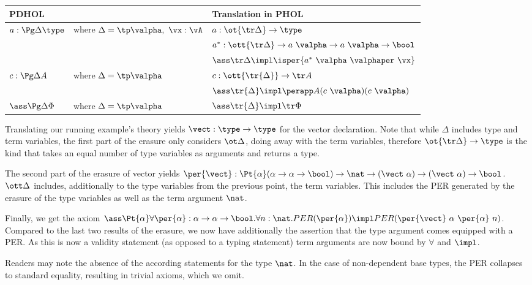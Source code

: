 \begin{center}
\begin{tabular}{|ll|l|}
\hline
PDHOL && Translation in PHOL\\
\hline
$a:\Pg\Delta\type$ &where $\Delta=\tp\valpha,\ \vx:\vA$ & $a:\ot{\tr\Delta}\to\type$ \\
     && $a^*:\ott{\tr\Delta}\to a\ \valpha \to a\ \valpha\to\bool$ \\
     && $\ass \tr\Delta \impl\isper{a^*\ \valpha\ \valphaper\ \vx}$ \\
\hline
$c:\Pg\Delta A$ &where $\Delta=\tp\valpha$            & $c:\ott{\tr{\Delta}}\to\tr A$ \\&& $\ass \tr{\Delta}\impl \perapp A {(c\ \valpha)} {(c\ \valpha)}$\\
\hline
$\ass \Pg\Delta  \Phi$ &where $\Delta=\tp\valpha$        & $\ass \tr{\Delta} \impl \tr \Phi$ \\
\hline
\end{tabular}
\end{center}

\begin{example}
  \label{ex:trans2}
  Translating our running example's theory yields \(\vect:\type\to\type\) for the vector
  declaration. Note that while \(\Delta\) includes type and term variables, the first part of
  the erasure only considers \(\ot\Delta\), doing away with the term variables, therefore
  \(\ot{\tr\Delta}\to\type\) is the kind that takes an equal number of type variables as arguments
  and returns a type.

  The second part of the erasure of vector yields
  \(\per{\vect}:\Pt{\alpha}(\alpha\to\alpha\to\bool)\to\nat\to(\vect\
  \alpha)\to(\vect\ \alpha)\to\bool\). \(\ott\Delta\) includes, additionally to the type variables
  from the previous point, the term variables. This includes the PER generated by the erasure
  of the type variables as well as the term argument \(\nat\).

  Finally, we get the axiom \(\ass
  \Pt{\alpha}\forall\per{\alpha}:\alpha\to\alpha\to\bool.\forall n:\nat.PER(\per{\alpha})\impl PER(\per{\vect}\
  \alpha\ \per{\alpha}\ n)\). 
  Compared to the last two results of the erasure, we now have additionally the assertion that
  the type argument comes equipped with a PER. As this is now a validity statement (as opposed
  to a typing statement) term arguments are now bound by \(\forall\) and \(\impl\).
  
  Readers may note the absence of the according statements for the type
  \(\nat\). In the case of non-dependent base types, the PER collapses to standard equality, resulting in trivial axioms, which we omit.
\end{example}

